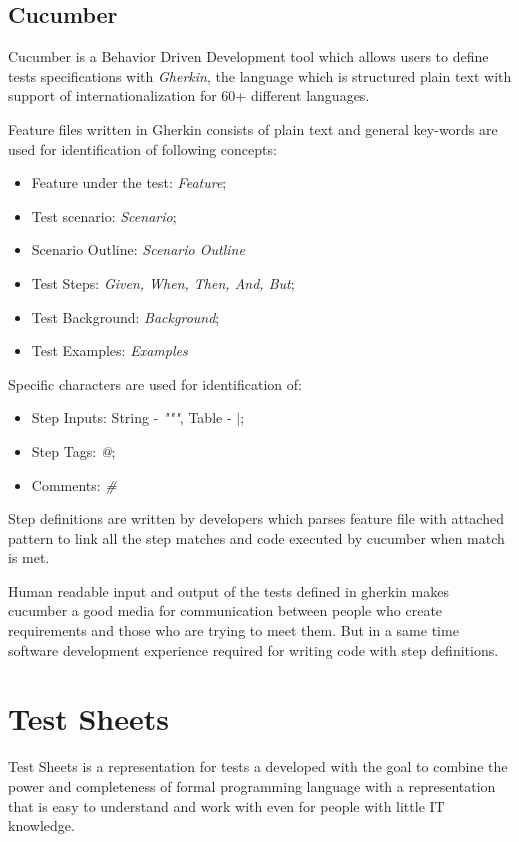 \subsection{Cucumber}
Cucumber is a Behavior Driven Development tool which allows users to define tests specifications with \textit{Gherkin}, the language which is structured plain text with support of internationalization for 60+ different languages\cite{cuceRef}.

Feature files written in Gherkin consists of plain text and general key-words are used for identification of following concepts:
\begin{itemize}
	\item Feature under the test: \textit{Feature};
	\item Test scenario: \textit{Scenario};
	\item Scenario Outline: \textit{Scenario Outline}
	\item Test Steps: \textit{Given, When, Then, And, But};
	\item Test Background:  \textit{Background};
	\item Test Examples: \textit{Examples}
\end{itemize}

Specific characters are used for identification of:
\begin{itemize}
	\item Step Inputs: String - \textit{"""}, Table - \textit{$|$};
	\item Step Tags: \textit{@};
	\item Comments: \textit{\#}
\end{itemize}

Step definitions are written by developers which parses feature file with attached pattern to link all the step matches and code executed by cucumber when match is met.

Human readable input and output of the tests defined in gherkin makes cucumber a good media for communication between people who create requirements and those who are trying to meet them. But in a same time software development experience required for writing code with step definitions.

\section{Test Sheets}
Test Sheets is a representation for tests a developed with the goal to combine the power and completeness of formal programming language with a representation that is easy to understand and work with even for people with little IT knowledge\cite{ts}.


